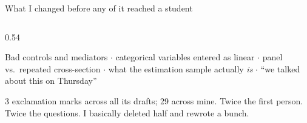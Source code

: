 \documentclass[aspectratio=169, 10pt]{beamer}
\begin{document}
\begin{frame}{What I changed before any of it reached a student}
\begin{columns}[T]
\begin{column}{0.54\textwidth}
\begin{tcolorbox}[dobox, title={\faPlus\quad What I added}, top=1pt, bottom=1pt, fonttitle=\bfseries\scriptsize]
\scriptsize
Bad controls and mediators $\cdot$ categorical variables entered as linear $\cdot$ panel vs.\ repeated cross-section $\cdot$ what the estimation sample actually \emph{is} $\cdot$ ``we talked about this on Thursday''
\end{tcolorbox}
\vskip3pt
\begin{tcolorbox}[pipelinebox, title={\faComment\quad And the register}, top=1pt, bottom=1pt, fonttitle=\bfseries\scriptsize]
\scriptsize
3 exclamation marks across all its drafts; 29 across mine. Twice the first person. Twice the questions. I basically deleted half and rewrote a bunch.
\end{tcolorbox}
\end{column}
\end{columns}
\vskip2pt
\end{frame}
\end{document}
